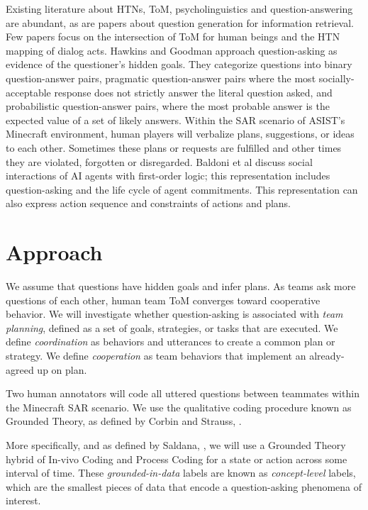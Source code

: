 \vspace{15pt}

Existing literature about HTNs, ToM, psycholinguistics and question-answering
are abundant, as are papers about question generation for information
retrieval. Few papers focus on the intersection of ToM for human beings and the HTN mapping of dialog acts. Hawkins and Goodman \citep{hawkins2017you} approach question-asking as evidence of the questioner’s hidden goals. They categorize questions into binary question-answer pairs, pragmatic question-answer pairs where the most socially-acceptable response does not strictly answer the literal question asked, and probabilistic question-answer pairs, where the most probable answer is the expected value of a set of likely answers. Within the SAR scenario of ASIST’s Minecraft environment, human players will
verbalize plans, suggestions, or ideas to each other. Sometimes these plans or
requests are fulfilled and other times they are violated, forgotten or
disregarded. Baldoni et al \citep{baldoni_2018} discuss social interactions
of AI agents with first-order logic; this representation includes
question-asking and the life cycle of agent commitments. This representation can also express action sequence and constraints of actions and plans.



\section{Approach}

We assume that questions have hidden goals and infer plans. As teams ask more questions of each other, human team ToM converges toward cooperative behavior.
We will investigate whether question-asking is associated with \textit{team
planning}, defined as a set of goals, strategies, or tasks that are executed.
We define \textit{coordination} as behaviors and utterances to create a common
plan or strategy. We define \textit{cooperation} as team behaviors that implement an already-agreed up on plan.

Two human annotators will code all uttered questions between teammates within the Minecraft SAR scenario.
We use the qualitative coding procedure known as Grounded Theory,
as defined by Corbin and Strauss, \citep{corbin_strauss_2015}. 

More specifically, and as defined by Saldana, \citep{saldana_2021}, we will use a Grounded Theory hybrid of In-vivo Coding and Process Coding for a state or action across some interval of time. These \textit{grounded-in-data} labels are known as \textit{concept-level} labels, which are the smallest pieces of data that encode a question-asking phenomena of interest.

